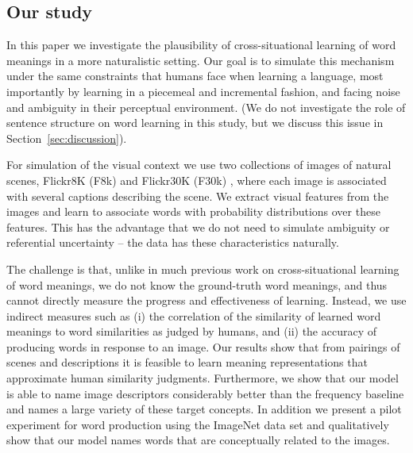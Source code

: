 \subsection{Our study}
\label{sec:out-study}

In this paper we investigate the plausibility of cross-situational
learning of word meanings in a more naturalistic setting. Our goal is
to simulate this mechanism under the same constraints that humans face
when learning a language, most importantly by learning in a piecemeal
and incremental fashion, and facing noise and ambiguity in their
perceptual environment. (We do not investigate the role of sentence structure on word learning in this study, but we discuss this issue in Section~\ref{sec:discussion}).
\label{why-incremental}

For simulation of the visual context we use two collections of images
of natural scenes, Flickr8K (F8k) \citep{rashtchian2010collecting} and
Flickr30K (F30k) \citep{young2014image}, where each image is associated with
several captions describing the scene. We extract visual features from
the images and learn to associate words with probability distributions
over these features. This has the advantage that we do not need to
simulate ambiguity or referential uncertainty -- the data has these
characteristics naturally.

The challenge is that, unlike in much previous work on
cross-situational learning of word meanings, we do not know the
ground-truth word meanings, and thus cannot directly measure the
progress and effectiveness of learning. Instead, we use indirect
measures such as (i) the correlation of the similarity of learned word
meanings to word similarities as judged by humans, and (ii) the
accuracy of producing words in response to an image. Our results show
that from pairings of scenes and descriptions it is feasible to learn
meaning representations that approximate human similarity
judgments. Furthermore, we show that our model is able to name image
descriptors considerably better than the frequency baseline and names
a large variety of these target concepts. In addition we present a
pilot experiment for word production using the ImageNet data set and
qualitatively show that our model names words that are conceptually
related to the images.
